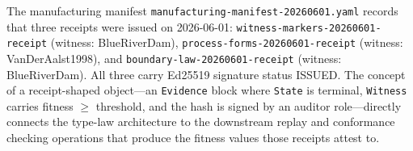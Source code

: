 The manufacturing manifest \texttt{manufacturing-manifest-20260601.yaml} records that
three receipts were issued on 2026-06-01: \texttt{witness-markers-20260601-receipt}
(witness: BlueRiverDam), \texttt{process-forms-20260601-receipt} (witness: VanDerAalst1998),
and \texttt{boundary-law-20260601-receipt} (witness: BlueRiverDam). All three carry
Ed25519 signature status ISSUED. The concept of a receipt-shaped object---an
\texttt{Evidence} block where \texttt{State} is terminal, \texttt{Witness} carries
fitness $\geq$ threshold, and the hash is signed by an auditor role---directly connects
the type-law architecture to the downstream replay and conformance checking operations
that produce the fitness values those receipts attest to.
